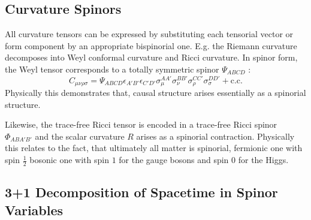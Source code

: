 \documentclass[11pt,a4paper]{article}
\theoremstyle{definition}
\begin{document}
	
	\subsection{Curvature Spinors}
	All curvature tensors can be expressed by substituting each tensorial vector or form component by an appropriate bispinorial one.
	E.g. the Riemann curvature decomposes into Weyl conformal curvature and Ricci curvature. In spinor form, the Weyl tensor corresponds to a totally symmetric spinor $\Psi_{ABCD}$ \cite{penrose1984}:
	\begin{equation}
		C_{\mu\nu\rho\sigma} = \Psi_{ABCD} \epsilon_{A'B'} \epsilon_{C'D'} \sigma^{AA'}_\mu \sigma^{BB'}_\nu \sigma^{CC'}_\rho \sigma^{DD'}_\sigma + \text{c.c.}
		\label{eq:weyl_spinor}
	\end{equation}
	Physically this demonstrates that, causal structure arises essentially as a spinorial structure.
	
	Likewise, the trace-free Ricci tensor is encoded in a trace-free Ricci spinor $\Phi_{ABA'B'}$ and the scalar curvature $R$ arises as a spinorial contraction. Physically this relates to the fact, that ultimately all matter is spinorial, fermionic one with spin $\frac{1}{2}$ bosonic one with spin $1$ for the gauge bosons and  spin $0$ for the Higgs.  
	
	\subsection{3+1 Decomposition of Spacetime in Spinor Variables}
	
\end{document}
